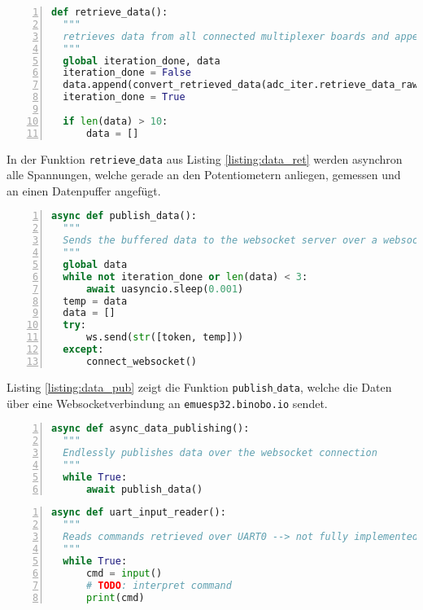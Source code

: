 \documentclass[paper=a4,12pt]{scrreprt}
\begin{document}
\begin{lstlisting}[caption={Firmware: Datenerfassung}, captionpos=b, label={listing:data_ret}, language=python, morekeywords={async, await, False, True, None}, numbers=left,
  stepnumber=1]
def retrieve_data():
  """
  retrieves data from all connected multiplexer boards and appends it to the data-buffer
  """
  global iteration_done, data
  iteration_done = False
  data.append(convert_retrieved_data(adc_iter.retrieve_data_raw()))
  iteration_done = True

  if len(data) > 10:
      data = []
\end{lstlisting}

In der Funktion \texttt{retrieve$\_$data} aus Listing \ref{listing:data_ret} werden asynchron alle Spannungen, welche gerade an den Potentiometern anliegen, gemessen und an einen Datenpuffer angefügt.\newline

\begin{lstlisting}[caption={Firmware: Datenveröffentlichung über eine Websocketverbindung}, captionpos=b, label={listing:data_pub}, language=python, morekeywords={async, await, None}, numbers=left,
  stepnumber=1]
async def publish_data():
  """
  Sends the buffered data to the websocket server over a websocket-connection
  """
  global data
  while not iteration_done or len(data) < 3:
      await uasyncio.sleep(0.001)
  temp = data
  data = []
  try:
      ws.send(str([token, temp]))
  except:
      connect_websocket()
\end{lstlisting}

Listing \ref{listing:data_pub} zeigt die Funktion \texttt{publish$\_$data}, welche die Daten über eine Websocketverbindung an \texttt{emuesp32.binobo.io} sendet.\newline

\begin{lstlisting}[caption={Firmware: Asynchroner Funktionsaufruf von \texttt{publish$\_$data}}, captionpos=b, label={listing:data_pub_async}, language=python, morekeywords={async, await}, numbers=left,
  stepnumber=1]
async def async_data_publishing():
  """
  Endlessly publishes data over the websocket connection
  """
  while True:
      await publish_data()
\end{lstlisting}

\begin{lstlisting}[caption={Firmware: UART cmd-Reader}, captionpos=b, label={listing:uart_cmd_read}, language=python, morekeywords={async, await}, numbers=left,
  stepnumber=1]
async def uart_input_reader():
  """
  Reads commands retrieved over UART0 --> not fully implemented yet!
  """
  while True:
      cmd = input()
      # TODO: interpret command
      print(cmd)
\end{lstlisting}
\end{document}
